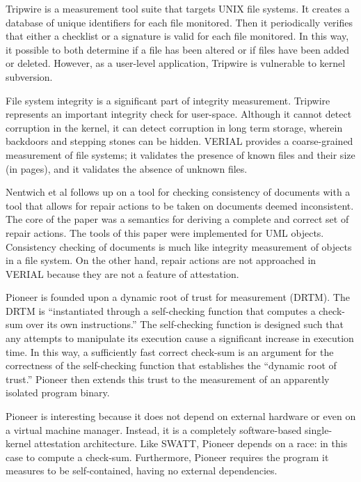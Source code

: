 \documentclass[a4paper,twoside]{article}
\begin{document}
Tripwire is a measurement tool suite that targets UNIX file systems. \cite{Tripwire} It creates a database of unique identifiers for each file monitored. Then it periodically verifies that either a checklist or a signature is valid for each file monitored. In this way, it possible to both determine if a file has been altered or if files have been added or deleted. However, as a user-level application, Tripwire is vulnerable to kernel subversion.

File system integrity is a significant part of integrity measurement. Tripwire represents an important integrity check for user-space. Although it cannot detect corruption in the kernel, it can detect corruption in long term storage, wherein backdoors and stepping stones can be hidden. VERIAL provides a coarse-grained measurement of file systems; it validates the presence of known files and their size (in pages), and it validates the absence of unknown files.

Nentwich et al \cite{ConMan} follows up on a tool for checking consistency of documents with a tool that allows for repair actions to be taken on documents deemed inconsistent. The core of the paper was a semantics for deriving a complete and correct set of repair actions. The tools of this paper were implemented for UML objects. Consistency checking of documents is much like integrity measurement of objects in a file system. On the other hand, repair actions are not approached in VERIAL because they are not a feature of attestation. 

Pioneer \cite{Pioneer} is founded upon a dynamic root of trust for measurement (DRTM). The DRTM is ``instantiated through a self-checking function that computes a check-sum over its own instructions.'' The self-checking function is designed such that any attempts to manipulate its execution cause a significant increase in execution time. In this way, a sufficiently fast correct check-sum is an argument for the correctness of the self-checking function that establishes the ``dynamic root of trust.'' Pioneer then extends this trust to the measurement of an apparently isolated program binary.

Pioneer is interesting because it does not depend on external hardware or even on a virtual machine manager. Instead, it is a completely software-based single-kernel attestation architecture. Like SWATT, Pioneer depends on a race: in this case to compute a check-sum. Furthermore, Pioneer requires the program it measures to be self-contained, having no external dependencies.
\end{document}
